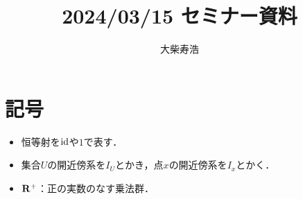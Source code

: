 \theoremstyle{mystyle}
\newtheorem{AXM}{公理}[section]
\newtheorem{DFN}[AXM]{定義}
\newtheorem{THM}[AXM]{定理}
\newtheorem*{THM*}{定理}
\newtheorem{PRP}[AXM]{命題}
\newtheorem{LMM}[AXM]{補題}
\newtheorem{CRL}[AXM]{系}
\newtheorem{EG}[AXM]{例}
\newtheorem*{EG*}{例}
\newtheorem{RMK}[AXM]{注意}
\newtheorem{CNV}[AXM]{約束}
\newtheorem{CMT}[AXM]{コメント}
\newtheorem*{CMT*}{コメント}
\newtheorem{NTN}[AXM]{記号}


\usepackage{framed}
\renewenvironment{leftbar}{%
  \def\FrameCommand{\textcolor{lightgray}{\vrule width 4pt} \hspace{10pt}}%
  \MakeFramed {\advance\hsize-\width \FrameRestore}}%
{\endMakeFramed}
\newenvironment{redleftbar}{%
  \def\FrameCommand{\textcolor{lightgray}{\vrule width 1pt} \hspace{10pt}}%
  \MakeFramed {\advance\hsize-\width \FrameRestore}}%
 {\endMakeFramed}








\def\inner<#1>{\langle #1 \rangle}








\title{2024/03/15 セミナー資料}
\author{大柴寿浩}
\date{}

\maketitle

\section*{記号}
\begin{itemize}
    \item 恒等射を\(\mathop{\mathrm{id}}\nolimits\)や\(1\)で表す．
    \item 集合\(U\)の開近傍系を\(I_U\)とかき，点\(x\)の開近傍系を\(I_x\)とかく．
    \item \(\mathbf{R}^+\)：正の実数のなす乗法群．
\end{itemize}

